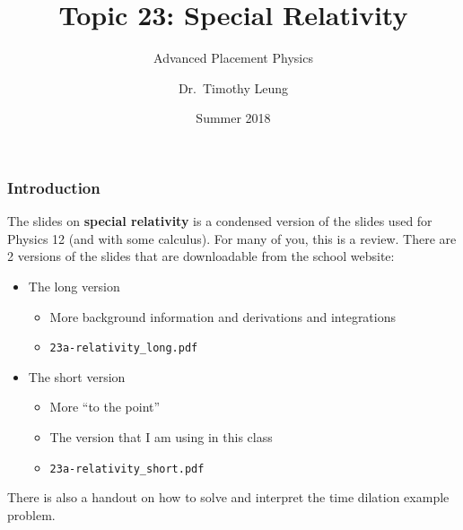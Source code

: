 \documentclass[12pt,compress,aspectratio=169]{beamer}
\title{Topic 23: Special Relativity}
\subtitle{Advanced Placement Physics}
\author[TML]{Dr.\ Timothy Leung}
\institute{Olympiads School}
\date{Summer 2018}
\begin{document}
\begin{frame}
  \maketitle
\end{frame}


\begin{frame}
  \frametitle{Introduction}
  The slides on \textbf{special relativity} is a condensed version of the
  slides used for Physics 12 (and with some calculus). For many of you, this is
  a review. There are 2 versions of the slides that are downloadable from
  the school website:
  \begin{itemize}
  \item The long version
    \begin{itemize}
    \item More background information and derivations and integrations
    \item \texttt{23a-relativity\_long.pdf}
    \end{itemize}
  \item The short version
    \begin{itemize}
    \item More ``to the point''
    \item The version that I am using in this class
    \item \texttt{23a-relativity\_short.pdf}
    \end{itemize}
  \end{itemize}
  There is also a handout on how to solve and interpret the time dilation
  example problem.
\end{frame}
\end{document}
